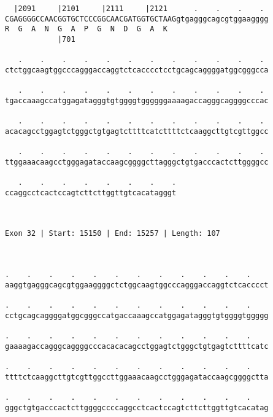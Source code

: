 \documentclass{article}
\begin{document}
\begin{Verbatim}
  |2091     |2101     |2111     |2121      .    .    .    . 
CGAGGGGCCAACGGTGCTCCCGGCAACGATGGTGCTAAGgtgagggcagcgtggaagggg
R  G  A  N  G  A  P  G  N  D  G  A  K                       
            |701                                            
  
   .    .    .    .    .    .    .    .    .    .    .    . 
ctctggcaagtggcccagggaccaggtctcacccctcctgcagcaggggatggcgggcca
                                                            
   .    .    .    .    .    .    .    .    .    .    .    . 
tgaccaaagccatggagatagggtgtggggtggggggaaaagaccagggcaggggcccac
                                                            
   .    .    .    .    .    .    .    .    .    .    .    . 
acacagcctggagtctgggctgtgagtcttttcatcttttctcaaggcttgtcgttggcc
                                                            
   .    .    .    .    .    .    .    .    .    .    .    . 
ttggaaacaagcctgggagataccaagcggggcttagggctgtgacccactcttggggcc
                                                            
   .    .    .    .    .    .    .    .
ccaggcctcactccagtcttcttggttgtcacatagggt
                                       
                                       
 
Exon 32 | Start: 15150 | End: 15257 | Length: 107



.    .    .    .    .    .    .    .    .    .    .    .    
aaggtgagggcagcgtggaaggggctctggcaagtggcccagggaccaggtctcacccct
                                                            
.    .    .    .    .    .    .    .    .    .    .    .    
cctgcagcaggggatggcgggccatgaccaaagccatggagatagggtgtggggtggggg
                                                            
.    .    .    .    .    .    .    .    .    .    .    .    
gaaaagaccagggcaggggcccacacacagcctggagtctgggctgtgagtcttttcatc
                                                            
.    .    .    .    .    .    .    .    .    .    .    .    
ttttctcaaggcttgtcgttggccttggaaacaagcctgggagataccaagcggggctta
                                                            
.    .    .    .    .    .    .    .    .    .    .    .    
gggctgtgacccactcttggggccccaggcctcactccagtcttcttggttgtcacatag
                                                            

\end{Verbatim}
\end{document}
